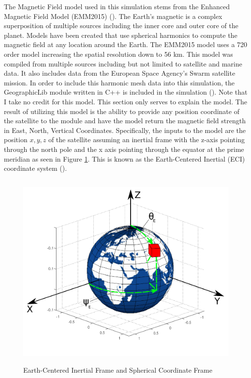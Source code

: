 The Magnetic Field model used in this simulation stems from the
Enhanced Magnetic Field Model (EMM2015) (\cite{EMM2015}). The Earth's magnetic is a
complex superposition of multiple sources including the inner core and
outer core of the planet. Models have been created that use spherical
harmonics to compute the magnetic field at any location around the
Earth. The EMM2015 model uses a 720 order model increasing the spatial
resolution down to 56 km. This model was compiled from multiple
sources including but not limited to satellite and marine data. It
also includes data from the European Space Agency's Swarm satellite
mission. In order to include this harmonic mesh data into this simulation,
the GeographicLib module written in C++ is included in the
simulation (\cite{GeographicLib}). Note that I take no credit for this
model. This section only serves to explain the model. The result of
utilizing this model is the ability to provide any position coordinate
of the satellite to the module and have
the model return the magnetic field strength in East, North, Vertical
Coordinates. Specifically, the inputs to the model are 
the position $x,y,z$ of the satellite assuming an inertial frame with
the z-axis pointing through the north pole and the x axis pointing
through the equator at the prime meridian as seen in Figure
\ref{f:spherical}. This is known as the Earth-Centered Inertial
(ECI) coordinate system (\cite{ECI}).
\begin{figure}[H]
  \begin{center}
  \includegraphics[height=100mm, width=120mm]{Figures/ECI.pdf}
  \end{center}
  \caption{Earth-Centered Inertial Frame and Spherical Coordinate Frame}\label{f:spherical}
\end{figure}
